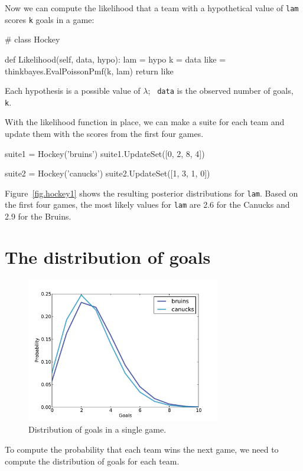 \documentclass[12pt]{book}
\theoremstyle{exercise}
\begin{document}
Now we can compute the likelihood that a team with a hypothetical
value of {\tt lam} scores {\tt k} goals in a game:

\begin{code}
# class Hockey

    def Likelihood(self, data, hypo):
        lam = hypo
        k = data
        like = thinkbayes.EvalPoissonPmf(k, lam)
        return like
\end{code}

Each hypothesis is a possible value of $\lambda$;  {\tt
  data} is the observed number of goals, {\tt k}.

With the likelihood function in place, we can make a suite for each
team and update them with the scores from the first four games.

\begin{code}
    suite1 = Hockey('bruins')
    suite1.UpdateSet([0, 2, 8, 4])
     
    suite2 = Hockey('canucks')
    suite2.UpdateSet([1, 3, 1, 0])
\end{code}  

Figure~\ref{fig.hockey1} shows the resulting posterior distributions
for {\tt lam}.  Based on the first four games, the most likely
values for {\tt lam} are 2.6 for the Canucks and 2.9 for the Bruins.


\section{The distribution of goals}

\begin{figure}
\centerline{\includegraphics[height=2.5in]{figs/hockey2.pdf}}
\caption{Distribution of goals in a single game.}
\label{fig.hockey2}
\end{figure}

To compute the probability that each team wins the next game,
we need to compute the distribution of goals for each team.
\end{document}
